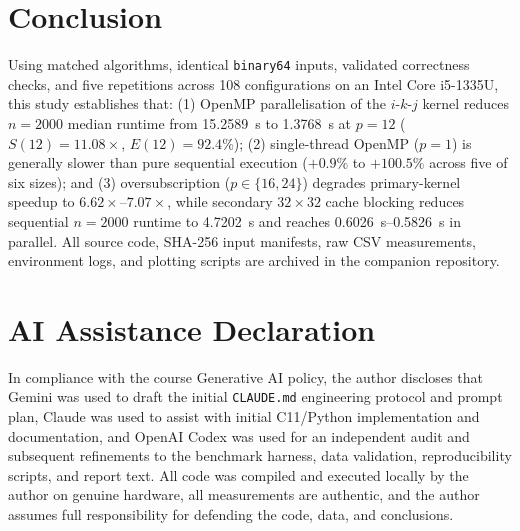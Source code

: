 \documentclass[11pt,a4paper]{article}
\begin{document}
\section{Conclusion}
Using matched algorithms, identical \texttt{binary64} inputs, validated correctness checks, and five repetitions across 108 configurations on an Intel Core i5-1335U, this study establishes that: (1) OpenMP parallelisation of the $i\text{-}k\text{-}j$ kernel reduces $n=2000$ median runtime from \SI{15.2589}{\second} to \SI{1.3768}{\second} at $p=12$ ($S(12)=11.08\times$, $E(12)=92.4\%$); (2) single-thread OpenMP ($p=1$) is generally slower than pure sequential execution ($+0.9\%$ to $+100.5\%$ across five of six sizes); and (3) oversubscription ($p \in \{16, 24\}$) degrades primary-kernel speedup to $6.62\times\text{--}7.07\times$, while secondary $32 \times 32$ cache blocking reduces sequential $n=2000$ runtime to \SI{4.7202}{\second} and reaches \SI{0.6026}{\second}--\SI{0.5826}{\second} in parallel. All source code, SHA-256 input manifests, raw CSV measurements, environment logs, and plotting scripts are archived in the companion repository.

\section*{AI Assistance Declaration}
In compliance with the course Generative AI policy, the author discloses that Gemini was used to draft the initial \texttt{CLAUDE.md} engineering protocol and prompt plan, Claude was used to assist with initial C11/Python implementation and documentation, and OpenAI Codex was used for an independent audit and subsequent refinements to the benchmark harness, data validation, reproducibility scripts, and report text. All code was compiled and executed locally by the author on genuine hardware, all measurements are authentic, and the author assumes full responsibility for defending the code, data, and conclusions.
\end{document}
